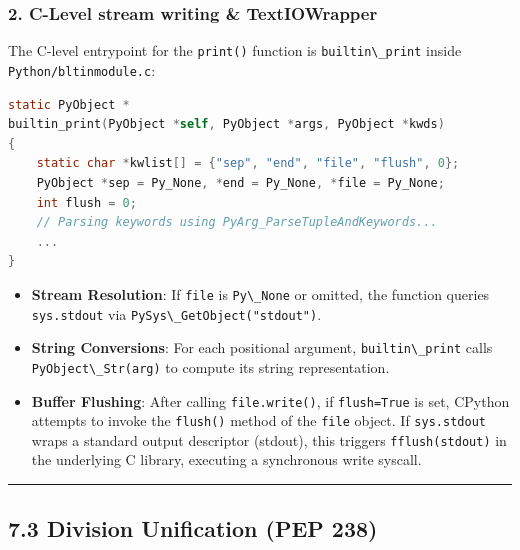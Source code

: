\hypertarget{c-level-stream-writing-textiowrapper}{%
\subsubsection{2. C-Level stream writing \&
TextIOWrapper}\label{c-level-stream-writing-textiowrapper}}

The C-level entrypoint for the \passthrough{\lstinline!print()!}
function is \passthrough{\lstinline!builtin\_print!} inside
\passthrough{\lstinline!Python/bltinmodule.c!}:

\begin{lstlisting}[language=C]
static PyObject *
builtin_print(PyObject *self, PyObject *args, PyObject *kwds)
{
    static char *kwlist[] = {"sep", "end", "file", "flush", 0};
    PyObject *sep = Py_None, *end = Py_None, *file = Py_None;
    int flush = 0;
    // Parsing keywords using PyArg_ParseTupleAndKeywords...
    ...
}
\end{lstlisting}

\begin{itemize}
\tightlist
\item
  \textbf{Stream Resolution}: If \passthrough{\lstinline!file!} is
  \passthrough{\lstinline!Py\_None!} or omitted, the function queries
  \passthrough{\lstinline!sys.stdout!} via
  \passthrough{\lstinline!PySys\_GetObject("stdout")!}.
\item
  \textbf{String Conversions}: For each positional argument,
  \passthrough{\lstinline!builtin\_print!} calls
  \passthrough{\lstinline!PyObject\_Str(arg)!} to compute its string
  representation.
\item
  \textbf{Buffer Flushing}: After calling
  \passthrough{\lstinline!file.write()!}, if
  \passthrough{\lstinline!flush=True!} is set, CPython attempts to
  invoke the \passthrough{\lstinline!flush()!} method of the
  \passthrough{\lstinline!file!} object. If
  \passthrough{\lstinline!sys.stdout!} wraps a standard output
  descriptor (stdout), this triggers
  \passthrough{\lstinline!fflush(stdout)!} in the underlying C library,
  executing a synchronous write syscall.
\end{itemize}

\begin{center}\rule{0.5\linewidth}{0.5pt}\end{center}

\hypertarget{division-unification-pep-238}{%
\subsection{7.3 Division Unification (PEP
238)}\label{division-unification-pep-238}}

